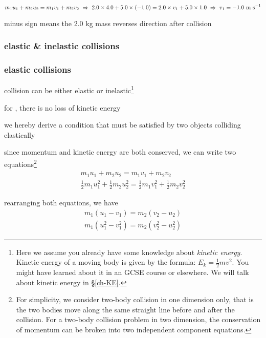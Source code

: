\solc\begin{equation*}
m_1 u_1 + m_2 u_2 = m_1 v_1 + m_2 v_2 \, \, \Rightarrow \, \, 2.0\times4.0+5.0\times(-1.0) = 2.0 \times v_1 + 5.0\times1.0 \, \, \Rightarrow \, \,  v_1 = -1.0 \text{ m s$^{-1}$}
\end{equation*}

minus sign means the 2.0 kg mass reverses direction after collision \eoe

\subsubsection{elastic \& inelastic collisions}

\subsubsection*{elastic collisions}

collision can be either elastic or inelastic\footnote{Here we assume you already have some knowledge about \emph{kinetic energy}. Kinetic energy of a moving body is given by the formula: $E_k = \frac{1}{2}mv^2$. You might have learned about it in an GCSE course or elsewhere. We will talk about kinetic energy in \S\ref{ch-KE}.}

\begin{ilight}
	for , there is no loss of kinetic energy
\end{ilight}



we hereby derive a condition that must be satisfied by two objects colliding elastically

since momentum and kinetic energy are both conserved, we can write two equations\footnote{For simplicity, we consider two-body collision in one dimension only, that is the two bodies move along the same straight line before and after the collision. For a two-body collision problem in two dimension, the conservation of momentum can be broken into two independent component equations.}
\begin{gather*}
	\boxed { m_1 u_1 + m_2 u_2 = m_1 v_1 + m_2 v_2 }\\
	\boxed { \frac{1}{2}m_1 u_1^2 + \frac{1}{2}m_2 u_2^2 = \frac{1}{2}m_1 v_1^2 + \frac{1}{2}m_2 v_2^2  }
\end{gather*}

rearranging both equations, we have
\begin{gather}
m_1 (u_1 - v_1) = m_2 (v_2 - u_2) \tag{1}\\
m_1 (u_1^2 - v_1^2) = m_2 (v_2^2 - u_2^2)  \tag{2}
\end{gather}

